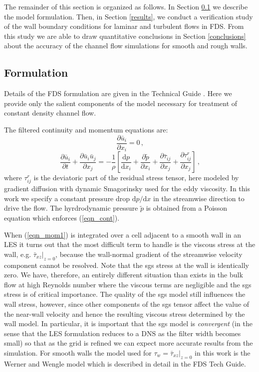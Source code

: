 \documentclass[11pt]{book}
\begin{document}
The remainder of this section is organized as follows. In Section \ref{formulation} we describe the model formulation. Then, in Section \ref{results}, we conduct a verification study of the wall boundary conditions for laminar and turbulent flows in FDS.  From this study we are able to draw quantitative conclusions in Section \ref{conclusions} about the accuracy of the channel flow simulations for smooth and rough walls.

\subsection{Formulation}
\label{formulation}

Details of the FDS formulation are given in the Technical Guide \cite{FDS_Math_Guide}.  Here we provide only the salient components of the model necessary for treatment of constant density channel flow.

The filtered continuity and momentum equations are:
\begin{equation}
\label{eqn_cont}
\frac{\partial \bar{u}_i}{\partial x_i} = 0 \,\mbox{,}
\end{equation}
\begin{equation}
\label{eqn_mom1}
\frac{\partial \bar{u}_i}{\partial t} + \frac{\partial \bar{u}_i \bar{u}_j}{\partial x_j} = -\frac{1}{\rho} \left[ \frac{\mbox{d}p}{\mbox{d}x_i} + \frac{\partial \tilde{p}}{\partial x_i} + \frac{\partial \bar{\tau}_{ij}}{\partial x_j} + \frac{\partial \tau_{ij}^{r}}{\partial x_j} \right]\,\mbox{,}
\end{equation}
where $\tau_{ij}^{r}$ is the deviatoric part of the residual stress tensor, here modeled by gradient diffusion with dynamic Smagorinsky \cite{Germano:1991} used for the eddy viscosity.  In this work we specify a constant pressure drop $\mbox{d}p/\mbox{d}x$ in the streamwise direction to drive the flow.  The hyrdrodynamic pressure $\tilde{p}$ is obtained from a Poisson equation which enforces (\ref{eqn_cont}).

When (\ref{eqn_mom1}) is integrated over a cell adjacent to a smooth wall in an LES it turns out that the most difficult term to handle is the viscous stress at the wall, e.g. $\bar{\tau}_{xz}|_{z=0}$, because the wall-normal gradient of the streamwise velocity component cannot be resolved.  Note that the sgs stress at the wall is identically zero.  We have, therefore, an entirely different situation than exists in the bulk flow at high Reynolds number where the viscous terms are negligible and the sgs stress is of critical importance.  The quality of the sgs model still influences the wall stress, however, since other components of the sgs tensor affect the value of the near-wall velocity and hence the resulting viscous stress determined by the wall model.  In particular, it is important that the sgs model is \emph{convergent} (in the sense that the LES formulation reduces to a DNS as the filter width becomes small) so that as the grid is refined we can expect more accurate results from the simulation.  For smooth walls the model used for $\tau_w = \bar{\tau}_{xz}|_{z=0}$ in this work is the Werner and Wengle model \cite{Werner:1991} which is described in detail in the FDS Tech Guide.
\end{document}
